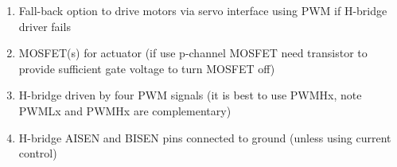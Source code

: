 \documentclass[a4paper, 12pt]{article}
\begin{document}
\begin{enumerate}
\item Fall-back option to drive motors via servo interface using PWM
  if H-bridge driver fails
  
\item MOSFET(s) for actuator (if use p-channel MOSFET need transistor
  to provide sufficient gate voltage to turn MOSFET off)

\item H-bridge driven by four PWM signals (it is best to use PWMHx,
  note PWMLx and PWMHx are complementary)

\item H-bridge AISEN and BISEN pins connected to ground (unless using
  current control)

\end{enumerate}
\end{document}

